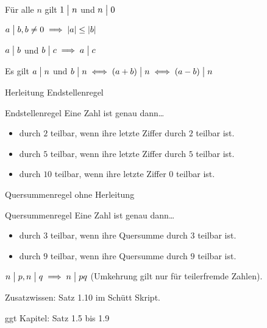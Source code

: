 \documentclass[../../main.tex]{subfiles}
\begin{document}
\begin{theorem}{}
    Für alle $n$ gilt $1\divides n$ und $n\divides 0$
\end{theorem}

\begin{theorem}{}
    $a\divides b,b\neq 0\implies |a|\leq|b|$
\end{theorem}

\begin{theorem}{}
    $a\divides b$ und $b\divides c\implies a\divides c$
\end{theorem}

\begin{theorem}{}
    Es gilt $a\divides n$ und $b\divides n\iff (a+b)\divides n\iff (a-b)\divides n$
\end{theorem}

Herleitung Endstellenregel
\begin{theorem}{Endstellenregel}
    Eine Zahl ist genau dann\dots
    \begin{itemize}
        \item durch $2$ teilbar, wenn ihre letzte Ziffer durch $2$ teilbar ist.
        \item durch $5$ teilbar, wenn ihre letzte Ziffer durch $5$ teilbar ist.
        \item durch $10$ teilbar, wenn ihre letzte Ziffer $0$ teilbar ist.
    \end{itemize}
\end{theorem}

Quersummenregel ohne Herleitung
\begin{theorem}{Quersummenregel}
    Eine Zahl ist genau dann\dots
    \begin{itemize}
        \item durch $3$ teilbar, wenn ihre Quersumme durch $3$ teilbar ist.
        \item durch $9$ teilbar, wenn ihre Quersumme durch $9$ teilbar ist.
    \end{itemize}
\end{theorem}

\begin{theorem}{}
    $n\divides p,n\divides q \implies n\divides pq$ (Umkehrung gilt nur für teilerfremde Zahlen).
\end{theorem}

Zusatzwissen: Satz 1.10 im Schütt Skript.

ggt Kapitel: Satz 1.5 bis 1.9
\end{document}
